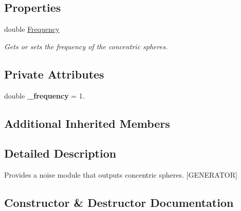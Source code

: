\subsection*{Properties}
\begin{DoxyCompactItemize}
\item 
double \hyperlink{class_lib_noise_1_1_generator_1_1_spheres_a59625fc0e73891f96426e71ed99b7291}{Frequency}
\begin{DoxyCompactList}\small\item\em Gets or sets the frequency of the concentric spheres. \end{DoxyCompactList}\end{DoxyCompactItemize}
\subsection*{Private Attributes}
\begin{DoxyCompactItemize}
\item 
\mbox{\label{class_lib_noise_1_1_generator_1_1_spheres_a48708bb468f565d7d953887dcd0be17d}} 
double {\bfseries \+\_\+frequency} = 1.
\end{DoxyCompactItemize}
\subsection*{Additional Inherited Members}


\subsection{Detailed Description}
Provides a noise module that outputs concentric spheres. \mbox{[}G\+E\+N\+E\+R\+A\+T\+OR\mbox{]} 



\subsection{Constructor \& Destructor Documentation}
\mbox{\label{class_lib_noise_1_1_generator_1_1_spheres_a520951544132df2120f1c73f552ce66b}} 
